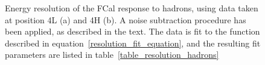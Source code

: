 %
%


\begin{figure}[!htb]
\begin{center}
\end{center}
\caption[Hadron energy resolution]{Energy resolution of the FCal response to hadrons, using data taken at position 4L (a) and 4H (b). A noise subtraction procedure has been applied, as described in the text. The data is fit to the function described in equation~\ref{resolution_fit_equation}, and the resulting fit parameters are listed in table~\ref{table_resolution_hadrons}}
\label{TBplot_hadron_resolution}
\end{figure}





